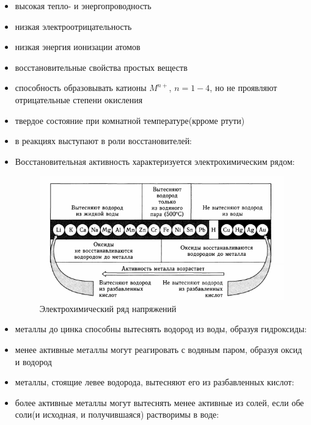 \begin{itemize}
    \item высокая тепло- и энергопроводность
    \item низкая электроотрицательность
    \item низкая энергия ионизации атомов
    \item восстановительные свойства простых веществ
    \item способность образовывать катионы $M^{n+}$, $n = 1-4$, но не проявляют отрицательные степени окисления
    \item твердое состояние при комнатной температуре(крроме ртути)
    \item в реакциях выступают в роли восстановителей:
    
    
    
    \item Восстановительная активность характеризуется электрохимическим рядом:
    
    \begin{figure}[H]
        \centering
        \includegraphics[width = \textwidth]{Pictures/12_metalrow.png}
        \caption{Электрохимический ряд напряжений}
        \label{fig:12row_metal}
    \end{figure}
    
    \item металлы до цинка способны вытеснять водород из воды, образуя гидроксиды:
    
    
    \item менее активные металлы могут реагировать с водяным паром, образуя оксид и водород
    
    
    \item металлы, стоящие левее водорода, вытесняют его из разбавленных кислот:
    
    
    \item более активные металлы могут вытеснять менее активные из солей, если обе соли(и исходная, и получившаяся) растворимы в воде:
    
    
    
\end{itemize} 